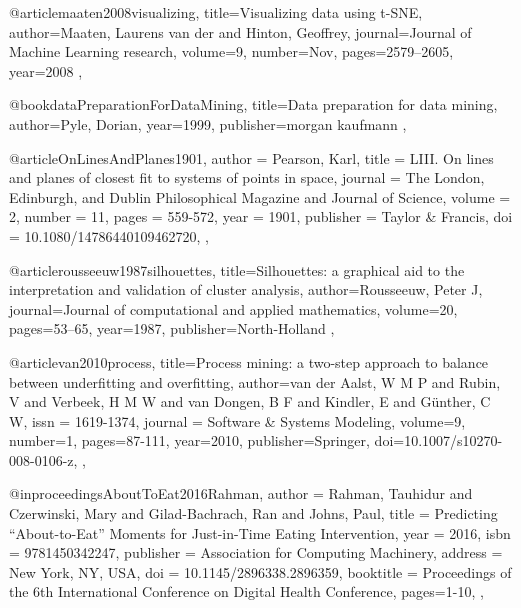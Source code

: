 @article{maaten2008visualizing,
  title={Visualizing data using t-SNE},
  author={Maaten, Laurens van der and Hinton, Geoffrey},
  journal={Journal of Machine Learning research},
  volume={9},
  number={Nov},
  pages={2579--2605},
  year={2008}
},



@book{dataPreparationForDataMining,
  title={Data preparation for data mining},
  author={Pyle, Dorian},
  year={1999},
  publisher={morgan kaufmann}
},





@article{OnLinesAndPlanes1901,
  author = {Pearson, Karl},
  title = {LIII. On lines and planes of closest fit to systems of points in space},
  journal = {The London, Edinburgh, and Dublin Philosophical Magazine and Journal of Science},
  volume = {2},
  number = {11},
  pages = {559-572},
  year  = {1901},
  publisher = {Taylor & Francis},
  doi = {10.1080/14786440109462720},
},


@article{rousseeuw1987silhouettes,
  title={Silhouettes: a graphical aid to the interpretation and validation of cluster analysis},
  author={Rousseeuw, Peter J},
  journal={Journal of computational and applied mathematics},
  volume={20},
  pages={53--65},
  year={1987},
  publisher={North-Holland}
},


@article{van2010process,
  title={Process mining: a two-step approach to balance between underfitting and overfitting},
  author={van der Aalst, W M P and Rubin, V and Verbeek, H M W and van Dongen, B F and Kindler, E and G{\"{u}}nther, C W},
  issn = {1619-1374},
  journal = {Software {\&} Systems Modeling},
  volume={9},
  number={1},
  pages={87-111},
  year={2010},
  publisher={Springer},
  doi={10.1007/s10270-008-0106-z},
},


@inproceedings{AboutToEat2016Rahman, 
  author = {Rahman, Tauhidur and Czerwinski, Mary and Gilad-Bachrach, Ran and Johns, Paul}, 
  title = {Predicting \enquote{About-to-Eat} Moments for Just-in-Time Eating Intervention}, 
  year = {2016}, 
  isbn = {9781450342247}, 
  publisher = {Association for Computing Machinery}, 
  address = {New York, NY, USA}, 
  doi = {10.1145/2896338.2896359}, 
  booktitle = {Proceedings of the 6th International Conference on Digital Health Conference},
  pages={1-10},
},

